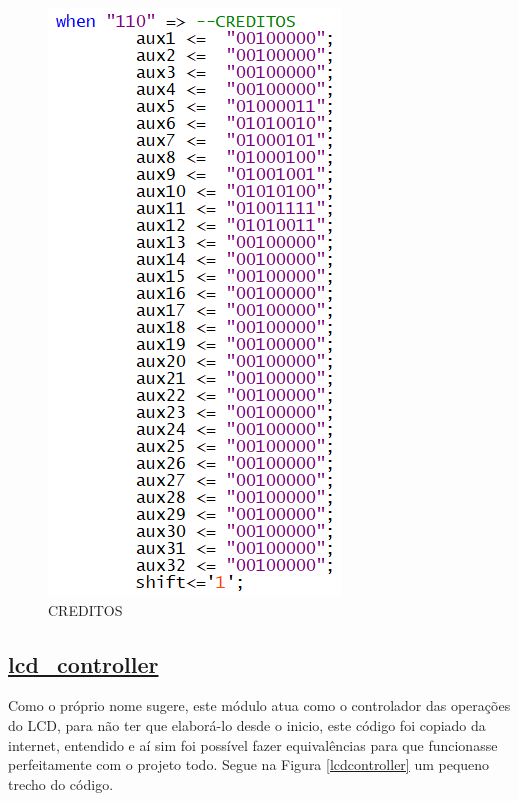 \documentclass[14pt, oneside]{book}
\newcommand\tab[1][1cm]{\hspace*{#1}}
\theoremstyle{definition}
\begin{document}
                \begin{figure}[H]
                    \centering
                    \includegraphics[scale=1]{lcdexample7.png}
                    \caption{CREDITOS}
                    \label{lcdexample7}
                \end{figure}
                
                \subsection[lcd\_controller]{\hyperlink{toc}{lcd\_controller}}
                \tab Como o próprio nome sugere, este módulo atua como o controlador das operações do LCD, para não ter que elaborá-lo desde o inicio, este código foi copiado da internet, entendido e aí sim foi possível fazer equivalências para que funcionasse perfeitamente com o projeto todo. Segue na Figura \ref{lcdcontroller} um pequeno trecho do código.
                
\end{document}

